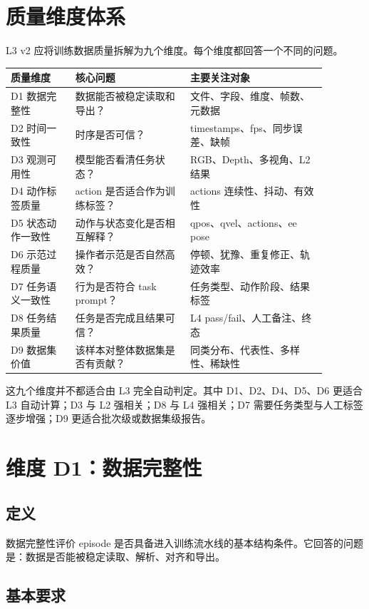 \documentclass[UTF8,zihao=-4]{ctexart}
\begin{document}
\section{质量维度体系}

L3 v2 应将训练数据质量拆解为九个维度。每个维度都回答一个不同的问题。

\begin{longtable}{p{0.18\linewidth}p{0.32\linewidth}p{0.38\linewidth}}
\toprule
\textbf{质量维度} & \textbf{核心问题} & \textbf{主要关注对象} \\
\midrule
D1 数据完整性 & 数据能否被稳定读取和导出？ & 文件、字段、维度、帧数、元数据 \\
D2 时间一致性 & 时序是否可信？ & timestamps、fps、同步误差、缺帧 \\
D3 观测可用性 & 模型能否看清任务状态？ & RGB、Depth、多视角、L2 结果 \\
D4 动作标签质量 & action 是否适合作为训练标签？ & actions 连续性、抖动、有效性 \\
D5 状态动作一致性 & 动作与状态变化是否相互解释？ & qpos、qvel、actions、ee pose \\
D6 示范过程质量 & 操作者示范是否自然高效？ & 停顿、犹豫、重复修正、轨迹效率 \\
D7 任务语义一致性 & 行为是否符合 task prompt？ & 任务类型、动作阶段、结果标签 \\
D8 任务结果质量 & 任务是否完成且结果可信？ & L4 pass/fail、人工备注、终态 \\
D9 数据集价值 & 该样本对整体数据集是否有贡献？ & 同类分布、代表性、多样性、稀缺性 \\
\bottomrule
\end{longtable}

这九个维度并不都适合由 L3 完全自动判定。其中 D1、D2、D4、D5、D6 更适合 L3 自动计算；D3 与 L2 强相关；D8 与 L4 强相关；D7 需要任务类型与人工标签逐步增强；D9 更适合批次级或数据集级报告。

\section{维度 D1：数据完整性}

\subsection{定义}

数据完整性评价 episode 是否具备进入训练流水线的基本结构条件。它回答的问题是：数据是否能被稳定读取、解析、对齐和导出。

\subsection{基本要求}
\end{document}
